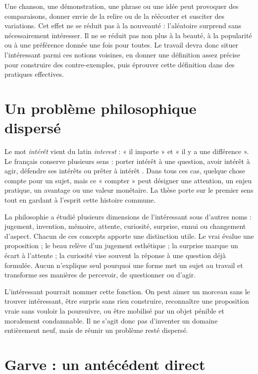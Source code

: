\documentclass[11pt,a4paper]{article}
\begin{document}
Une chanson, une démonstration, une phrase ou une idée peut provoquer des
comparaisons, donner envie de la relire ou de la réécouter et susciter des
variations. Cet effet ne se réduit pas à la nouveauté : l'aléatoire surprend
sans nécessairement intéresser. Il ne se réduit pas non plus à la beauté, à la
popularité ou à une préférence donnée une fois pour toutes. Le travail devra
donc situer l'intéressant parmi ces notions voisines, en donner une définition
assez précise pour construire des contre-exemples, puis éprouver cette
définition dans des pratiques effectives.

\section{Un problème philosophique dispersé}

Le mot \emph{intérêt} vient du latin \emph{interest} : « il importe » et « il y
a une différence ». Le français conserve plusieurs sens : porter intérêt à une
question, avoir intérêt à agir, défendre ses intérêts ou prêter à intérêt
\parencite{academie2026interet,cnrtl2026interet}. Dans tous ces cas, quelque
chose compte pour un sujet, mais ce « compter » peut désigner une attention, un
enjeu pratique, un avantage ou une valeur monétaire. La thèse porte sur le
premier sens tout en gardant à l'esprit cette histoire commune.

La philosophie a étudié plusieurs dimensions de l'intéressant sous d'autres
noms : jugement, invention, mémoire, attente, curiosité, surprise, ennui ou
changement d'aspect. Chacun de ces concepts apporte une distinction utile. Le
vrai évalue une proposition ; le beau relève d'un jugement esthétique ; la
surprise marque un écart à l'attente ; la curiosité vise souvent la réponse à
une question déjà formulée. Aucun n'explique seul pourquoi une forme met un
sujet au travail et transforme ses manières de percevoir, de questionner ou
d'agir.

L'intéressant pourrait nommer cette fonction. On peut aimer un morceau sans le
trouver intéressant, être surpris sans rien construire, reconnaître une
proposition vraie sans vouloir la poursuivre, ou être mobilisé par un objet
pénible et moralement condamnable. Il ne s'agit donc pas d'inventer un domaine
entièrement neuf, mais de réunir un problème resté dispersé.

\section{Garve : un antécédent direct}
\end{document}

